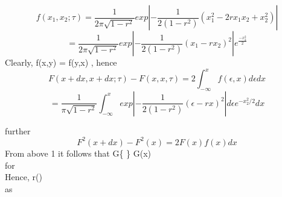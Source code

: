 \documentclass{beamer}
\begin{document}
\begin{frame}

\begin{equation}
    f(x_{1},x_{2};\tau) = \frac{1}{2\pi\sqrt{1-r^2}}exp\left|-\frac{1}{2(1-r^2)}(x^2_{1}-2rx_{1}x_{2}+x^2_{2})\right|
\end{equation}
\begin{equation}
   = \frac{1}{2\pi\sqrt{1-r^2}}exp\left|-\frac{1}{2(1-r^2)}(x_{1}-rx_{2})^2\right|e^{\frac{-x^2_{2}}{2}}
\end{equation}
Clearly, f(x,y) = f(y,x) , hence
\begin{equation*}
    F(x+dx, x+dx;\tau) - F(x,x,\tau) = 2\int_{-\infty}^{x}f(\epsilon,x)d{\epsilon}dx
\end{equation*}
\begin{equation}
    =\frac{1}{\pi\sqrt{1-r^2}}\int_{-\infty}^{x}exp\left|-\frac{1}{2(1-r^2)}(\epsilon-rx)^2\right|d{\epsilon}e^{-x^2_{2}/2}dx
\end{equation}
\end{frame}
\begin{frame}
    further
    \begin{equation*}
        F^2(x+dx) - F^2(x) = 2F(x)f(x)dx
    \end{equation*}
    From above 1 it follows that
    G\left\{  \right\} \longrightarrow G(x)\\  for \tau \rightarrow \infty\\ Hence, r(\tau)  \\
    as \tau \rightarrow \infty
\end{frame}
\end{document}

